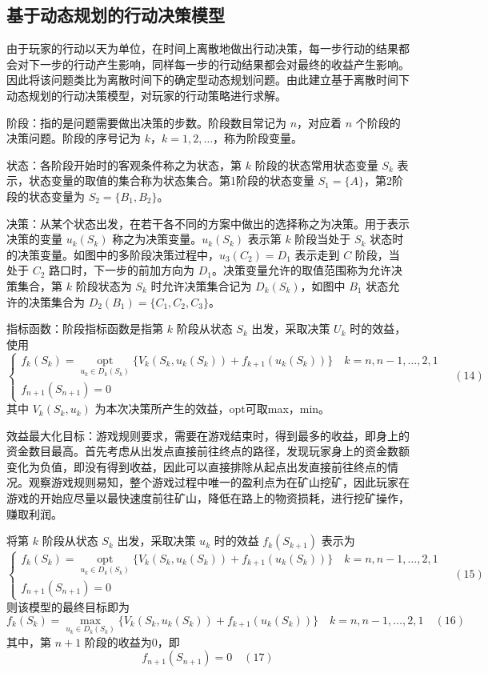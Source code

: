 \documentclass[UTF8]{article}
\begin{document}
\subsection*{基于动态规划的行动决策模型}
由于玩家的行动以天为单位，在时间上离散地做出行动决策，每一步行动的结果都会对下一步的行动产生影响，同样每一步的行动结果都会对最终的收益产生影响。因此将该问题类比为离散时间下的确定型动态规划问题。由此建立基于离散时间下动态规划的行动决策模型，对玩家的行动策略进行求解。

阶段：指的是问题需要做出决策的步数。阶段数目常记为 \(n\)，对应着 \(n\) 个阶段的决策问题。阶段的序号记为 \(k\)，\(k = 1,2,\dots\)，称为阶段变量。

状态：各阶段开始时的客观条件称之为状态，第 \(k\) 阶段的状态常用状态变量 \(S_k\) 表示，状态变量的取值的集合称为状态集合。第1阶段的状态变量 \(S_1 = \{A\}\)，第2阶段的状态变量为 \(S_2 = \{B_1,B_2\}\)。

决策：从某个状态出发，在若干各不同的方案中做出的选择称之为决策。用于表示决策的变量 \(u_k(S_k)\) 称之为决策变量。\(u_k(S_k)\) 表示第 \(k\) 阶段当处于 \(S_k\) 状态时的决策变量。如图中的多阶段决策过程中，\(u_3(C_2) = D_1\) 表示走到 \(C\) 阶段，当处于 \(C_2\) 路口时，下一步的前加方向为 \(D_1\)。决策变量允许的取值范围称为允许决策集合，第 \(k\) 阶段状态为 \(S_k\) 时允许决策集合记为 \(D_k(S_k)\)，如图中 \(B_1\) 状态允许的决策集合为 \(D_2(B_1) = \{C_1,C_2,C_3\}\)。

指标函数：阶段指标函数是指第 \(k\) 阶段从状态 \(S_k\) 出发，采取决策 \(U_k\) 时的效益，使用
\[
\begin{cases}
f_k(S_k) = \underset{u_k\in D_k(S_k)}{\operatorname{opt}}\{V_k(S_k,u_k(S_k)) + f_{k+1}(u_k(S_k))\} \quad k = n,n-1,\dots,2,1 \\
f_{n+1}(S_{n+1}) = 0
\end{cases} \quad (14)
\]
其中 \(V_k(S_k,u_k)\) 为本次决策所产生的效益，opt可取max，min。

效益最大化目标：游戏规则要求，需要在游戏结束时，得到最多的收益，即身上的资金数目最高。首先考虑从出发点直接前往终点的路径，发现玩家身上的资金数额变化为负值，即没有得到收益，因此可以直接排除从起点出发直接前往终点的情况。观察游戏规则易知，整个游戏过程中唯一的盈利点为在矿山挖矿，因此玩家在游戏的开始应尽量以最快速度前往矿山，降低在路上的物资损耗，进行挖矿操作，赚取利润。

将第 \(k\) 阶段从状态 \(S_k\) 出发，采取决策 \(u_k\) 时的效益 \(f_k(S_{k+1})\) 表示为
\[
\begin{cases}
f_k(S_k) = \underset{u_k\in D_k(S_k)}{\operatorname{opt}}\{V_k(S_k,u_k(S_k)) + f_{k+1}(u_k(S_k))\} \quad k = n,n-1,\dots,2,1 \\
f_{n+1}(S_{n+1}) = 0
\end{cases} \quad (15)
\]
则该模型的最终目标即为
\[
f_k(S_k) = \underset{u_k\in D_k(S_k)}{\operatorname{max}}\{V_k(S_k,u_k(S_k)) + f_{k+1}(u_k(S_k))\} \quad k = n,n-1,\dots,2,1 \quad (16)
\]
其中，第 \(n+1\) 阶段的收益为0，即
\[
f_{n+1}(S_{n+1}) = 0 \quad (17)
\]
\end{document}

